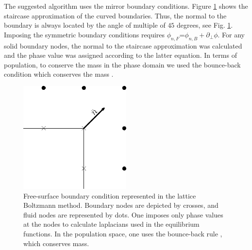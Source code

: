 \documentclass{article}
\begin{document}
The suggested algorithm uses the mirror boundary conditions. Figure \ref{fig:free:surface} shows the staircase approximation of the curved boundaries. 
Thus, the normal to the boundary is always located by the angle of multiple of $45$ degrees, see Fig. \ref{fig:free:surface}.  Imposing the
symmetric boundary conditions requires $\phi_{n,F}$=$\phi_{n,B}+\partial_{\perp} \phi$. For any solid boundary nodes, the normal to the staircase approximation was calculated and the phase value was assigned according to the latter equation.  In terms of population, to conserve the mass in the phase domain we used the bounce-back condition which conserves the mass \cite{yu}.  


\begin{figure}[h!]
\includegraphics[width=0.5\textwidth]{Figures/free_surface.eps}
\caption{Free-surface boundary condition represented in the lattice Boltzmann method. 
Boundary nodes are depicted by crosses, and fluid nodes are represented by dots. One imposes only phase values at the nodes to calculate laplacians used in the equilibrium functions. In the population space, one uses the bounce-back rule \cite{yu}, which conserves mass.
\label{fig:free:surface}}
\end{figure}
\end{document}
